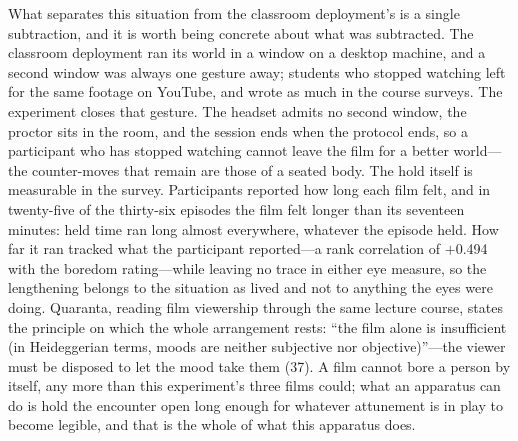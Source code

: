What separates this situation from the classroom deployment's is a single subtraction, and it
is worth being concrete about what was subtracted. The classroom deployment ran its world in a
window on a desktop machine, and a second window was always one gesture away; students who
stopped watching left for the same footage on YouTube, and wrote as much in the course surveys.
The experiment closes that gesture. The headset admits no second window, the proctor sits in
the room, and the session ends when the protocol ends, so a participant who has stopped
watching cannot leave the film for a better world---the counter-moves that remain are those of
a seated body. The hold itself is measurable in the survey. Participants reported how long each
film felt, and in twenty-five of the thirty-six episodes the film felt longer than its
seventeen minutes: held time ran long almost everywhere, whatever the episode held. How far it
ran tracked what the participant reported---a rank correlation of $+$0.494 with the boredom
rating---while leaving no trace in either eye measure, so the lengthening belongs to the
situation as lived and not to anything the eyes were doing. Quaranta, reading film viewership
through the same lecture course, states the principle on which the whole arrangement rests:
``the film alone is insufficient (in Heideggerian terms, moods are neither subjective nor
objective)''---the viewer must be disposed to let the mood take them (37). A film cannot bore a
person by itself, any more than this experiment's three films could; what an apparatus can do
is hold the encounter open long enough for whatever attunement is in play to become legible,
and that is the whole of what this apparatus does.

